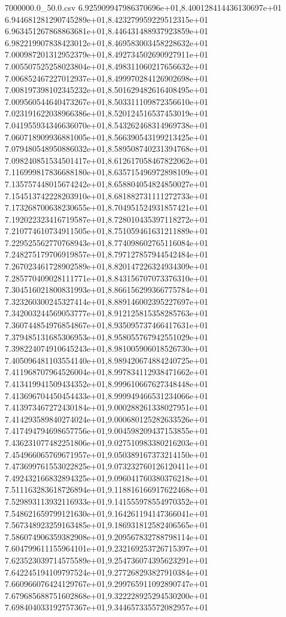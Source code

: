 \begin{filecontents*}{7000000.0_50.0.csv}
6.925909947986370696e+01,8.400128414436130697e+01
6.944681281290745289e+01,8.423279959229512315e+01
6.963451267868863681e+01,8.446431488937923859e+01
6.982219907838423012e+01,8.469583003458228632e+01
7.000987201312952379e+01,8.492734502690927911e+01
7.005507525258023804e+01,8.498311060217656632e+01
7.006852467227012937e+01,8.499970284126902698e+01
7.008197398102345232e+01,8.501629482616408495e+01
7.009560544640473267e+01,8.503311109872356610e+01
7.023191622038966386e+01,8.520124516537453019e+01
7.041955934346636070e+01,8.543262468314969738e+01
7.060718909936881005e+01,8.566390543199213425e+01
7.079480548950886032e+01,8.589508740231394768e+01
7.098240851534501417e+01,8.612617058467822062e+01
7.116999817836688180e+01,8.635715496972898109e+01
7.135757448015674242e+01,8.658804054824850027e+01
7.154513742228203910e+01,8.681882731111272733e+01
7.173268700638230655e+01,8.704951524931857421e+01
7.192022323416719587e+01,8.728010435397118272e+01
7.210774610734911505e+01,8.751059461631211889e+01
7.229525562770768943e+01,8.774098602765116084e+01
7.248275179706919857e+01,8.797127857944542484e+01
7.267023461728902589e+01,8.820147226324934309e+01
7.285770409028111771e+01,8.843156707073376310e+01
7.304516021800831993e+01,8.866156299366775784e+01
7.323260300245327414e+01,8.889146002395227697e+01
7.342003244569053777e+01,8.912125815358285763e+01
7.360744854976854867e+01,8.935095737466417631e+01
7.379485131685306953e+01,8.958055767942551029e+01
7.398224074910645243e+01,8.981005906018526730e+01
7.405096481103554140e+01,8.989420674884240725e+01
7.411968707964526004e+01,8.997834112938471662e+01
7.413419941509434352e+01,8.999610667627348448e+01
7.413696704450454433e+01,8.999949466531234066e+01
7.413973467272430184e+01,9.000288261338027951e+01
7.414293589840274024e+01,9.000680125282633526e+01
7.417494794698657756e+01,9.004598209437153855e+01
7.436231077482251806e+01,9.027510983380216203e+01
7.454966065769671957e+01,9.050389167373214150e+01
7.473699761553022825e+01,9.073232760126120411e+01
7.492432166832894325e+01,9.096041760380376218e+01
7.511163283618726894e+01,9.118816166917622468e+01
7.529893113932116933e+01,9.141555978554970352e+01
7.548621659799121630e+01,9.164261194147366041e+01
7.567348923259163485e+01,9.186931812582406565e+01
7.586074906359382908e+01,9.209567832788798114e+01
7.604799611155964101e+01,9.232169253726715397e+01
7.623523039714575589e+01,9.254736074395623291e+01
7.642245194109797524e+01,9.277268293827910384e+01
7.660966076424129767e+01,9.299765911092890747e+01
7.679685688751602868e+01,9.322228925294530200e+01
7.698404033192757367e+01,9.344657335572082957e+01

\end{filecontents*}
